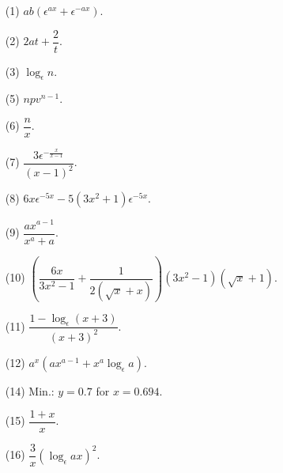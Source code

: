 \documentclass[a4paper,11pt,openany]{ltjsbook}
\begin{document}
\begin{enumerate}
\item[(1)] $ab(\epsilon^{ax} + \epsilon^{-ax})$.

\item[(2)] $2at + \dfrac{2}{t}$.

\item[(3)] $\log_\epsilon n$.

\item[(5)] $npv^{n-1}$.

\item[(6)] $\dfrac{n}{x}$.

\item[(7)] $\dfrac{3\epsilon^{- \frac{x}{x-1}}}{(x - 1)^2}$.

\item[(8)] $6x \epsilon^{-5x} - 5(3x^2 + 1)\epsilon^{-5x}$.

\item[(9)] $\dfrac{ax^{a-1}}{x^a + a}$.

\item[(10)] $\left(\dfrac{6x}{3x^2-1} + \dfrac{1}{2\left(\sqrt x + x\right)}\right) \left(3x^2-1\right)\left(\sqrt x + 1\right)$.

\item[(11)] $\dfrac{1 - \log_\epsilon \left(x + 3\right)}{\left(x + 3\right)^2}$.

\item[(12)] $a^x\left(ax^{a-1} + x^a \log_\epsilon a\right)$.

\item[(14)] Min.: $y = 0.7$ for $x = 0.694$.

\item[(15)] $\dfrac{1 + x}{x}$.

\item[(16)] $\dfrac{3}{x} (\log_\epsilon ax)^2$.
\par\smallskip

\end{enumerate}
\par\bigskip{}\par\smallskip
\end{document}

